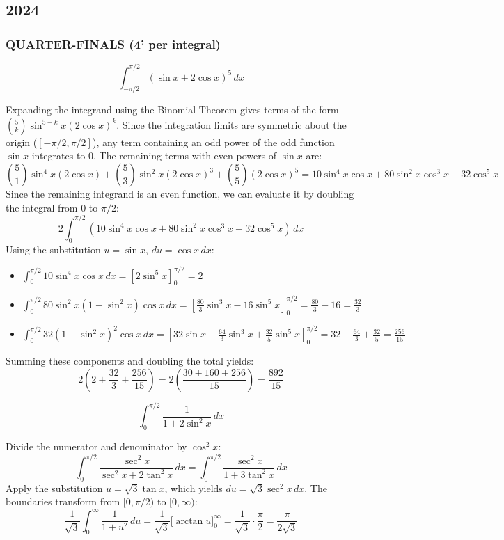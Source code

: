 \subsection*{2024}

\subsubsection*{QUARTER-FINALS (4' per integral)}
\begin{questions}

    \question \[ \int_{-\pi/2}^{\pi/2} (\sin x + 2\cos x)^5 \,dx \]
    \begin{solution}
        Expanding the integrand using the Binomial Theorem gives terms of the form $\binom{5}{k} \sin^{5-k}x (2\cos x)^k$. Since the integration limits are symmetric about the origin ($[-\pi/2, \pi/2]$), any term containing an odd power of the odd function $\sin x$ integrates to $0$. The remaining terms with even powers of $\sin x$ are:
        \[ \binom{5}{1}\sin^4 x (2\cos x) + \binom{5}{3}\sin^2 x (2\cos x)^3 + \binom{5}{5}(2\cos x)^5 = 10\sin^4 x\cos x + 80\sin^2 x\cos^3 x + 32\cos^5 x \]
        Since the remaining integrand is an even function, we can evaluate it by doubling the integral from $0$ to $\pi/2$:
        \[ 2 \int_{0}^{\pi/2} \left(10\sin^4 x\cos x + 80\sin^2 x\cos^3 x + 32\cos^5 x\right) \,dx \]
        Using the substitution $u = \sin x$, $du = \cos x \,dx$:
        \begin{itemize}
            \item $\int_{0}^{\pi/2} 10\sin^4 x\cos x \,dx = \left[ 2\sin^5 x \right]_0^{\pi/2} = 2$
            \item $\int_{0}^{\pi/2} 80\sin^2 x(1-\sin^2 x)\cos x \,dx = \left[ \frac{80}{3}\sin^3 x - 16\sin^5 x \right]_0^{\pi/2} = \frac{80}{3} - 16 = \frac{32}{3}$
            \item $\int_{0}^{\pi/2} 32(1-\sin^2 x)^2\cos x \,dx = \left[ 32\sin x - \frac{64}{3}\sin^3 x + \frac{32}{5}\sin^5 x \right]_0^{\pi/2} = 32 - \frac{64}{3} + \frac{32}{5} = \frac{256}{15}$
        \end{itemize}
        Summing these components and doubling the total yields:
        \[ 2 \left( 2 + \frac{32}{3} + \frac{256}{15} \right) = 2 \left( \frac{30 + 160 + 256}{15} \right) = \frac{892}{15} \]
    \end{solution}

    \question \[ \int_{0}^{\pi/2} \frac{1}{1 + 2\sin^2 x} \,dx \]
    \begin{solution}
        Divide the numerator and denominator by $\cos^2 x$:
        \[ \int_{0}^{\pi/2} \frac{\sec^2 x}{\sec^2 x + 2\tan^2 x} \,dx = \int_{0}^{\pi/2} \frac{\sec^2 x}{1 + 3\tan^2 x} \,dx \]
        Apply the substitution $u = \sqrt{3}\tan x$, which yields $du = \sqrt{3}\sec^2 x \,dx$. The boundaries transform from $[0, \pi/2)$ to $[0, \infty)$:
        \[ \frac{1}{\sqrt{3}} \int_{0}^{\infty} \frac{1}{1 + u^2} \,du = \frac{1}{\sqrt{3}} \Big[ \arctan u \Big]_0^\infty = \frac{1}{\sqrt{3}} \cdot \frac{\pi}{2} = \frac{\pi}{2\sqrt{3}} \]
    \end{solution}


\end{questions}
